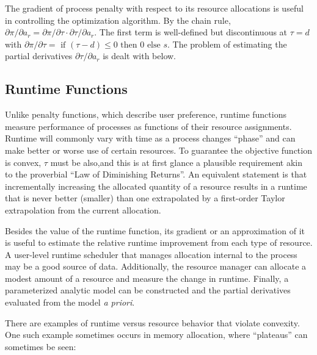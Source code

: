 The gradient of process penalty with respect to its resource allocations is useful in controlling the optimization algorithm.  By the chain rule,
$\partial\pi/\partial a_r = \partial\pi/\partial\tau\cdot\partial\tau/\partial a_r$.
The first term is well-defined but discontinuous at $\tau = d$ with
$\partial\pi/\partial\tau = \mbox{ if } (\tau - d) \leq 0 \mbox{ then } 0 \mbox{ else } s$.
The problem of estimating the partial derivatives $\partial\tau/\partial a_r$ is dealt with below.

\subsection*{Runtime Functions}

Unlike penalty functions, which describe user preference, runtime functions measure performance of processes as functions of their resource assignments.  Runtime will commonly vary with time as a process changes ``phase'' and can make better or worse use of certain resources.  To guarantee the objective function is convex, $\tau$ must be also,and this is at first glance a plausible requirement akin to the proverbial ``Law of Diminishing Returns''.  An equivalent statement is that incrementally increasing the allocated quantity of a resource results in a runtime that is never better (smaller) than one extrapolated by a first-order Taylor extrapolation from the current allocation.

Besides the value of the runtime function, its gradient or an approximation of it is useful to estimate the relative runtime improvement from each type of resource.  A user-level runtime scheduler that manages allocation internal to the process may be a good source of data.  Additionally, the resource manager can allocate a modest amount of a resource and measure the change in runtime. Finally, a parameterized analytic model can be constructed and the partial derivatives evaluated from the model \emph{a priori}.

There are examples of runtime versus resource behavior that violate convexity.  One such example sometimes occurs in memory allocation, where “plateaus” can sometimes be seen:

